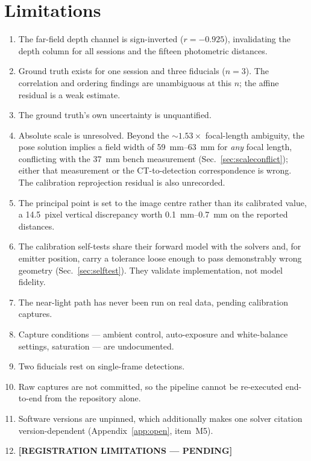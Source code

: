 \documentclass[journal,10pt]{IEEEtran}
\newcommand{\TODO}[1]{\textcolor{todoRed}{\textbf{[#1]}}}
\begin{document}
\section{Limitations}
\begin{enumerate}
\item The far-field depth channel is sign-inverted ($r=-0.925$), invalidating the
depth column for all sessions and the fifteen photometric distances.
\item Ground truth exists for one session and three fiducials ($n=3$). The
correlation and ordering findings are unambiguous at this $n$; the affine
residual is a weak estimate.
\item The ground truth's own uncertainty is unquantified.
\item Absolute scale is unresolved. Beyond the ${\sim}1.53\times$ focal-length
ambiguity, the pose solution implies a field width of
\SIrange{59}{63}{\milli\metre} for \emph{any} focal length, conflicting with the
\SI{37}{\milli\metre} bench measurement (Sec.~\ref{sec:scaleconflict}); either
that measurement or the CT-to-detection correspondence is wrong. The calibration
reprojection residual is also unrecorded.
\item The principal point is set to the image centre rather than its calibrated
value, a \SI{14.5}{pixel} vertical discrepancy worth
\SIrange{0.1}{0.7}{\milli\metre} on the reported distances.
\item The calibration self-tests share their forward model with the solvers and,
for emitter position, carry a tolerance loose enough to pass demonstrably wrong
geometry (Sec.~\ref{sec:selftest}). They validate implementation, not model
fidelity.
\item The near-light path has never been run on real data, pending calibration
captures.
\item Capture conditions --- ambient control, auto-exposure and white-balance
settings, saturation --- are undocumented.
\item Two fiducials rest on single-frame detections.
\item Raw captures are not committed, so the pipeline cannot be re-executed
end-to-end from the repository alone.
\item Software versions are unpinned, which additionally makes one solver
citation version-dependent (Appendix~\ref{app:open}, item~M5).
\item \TODO{REGISTRATION LIMITATIONS --- PENDING}
\end{enumerate}
\end{document}
